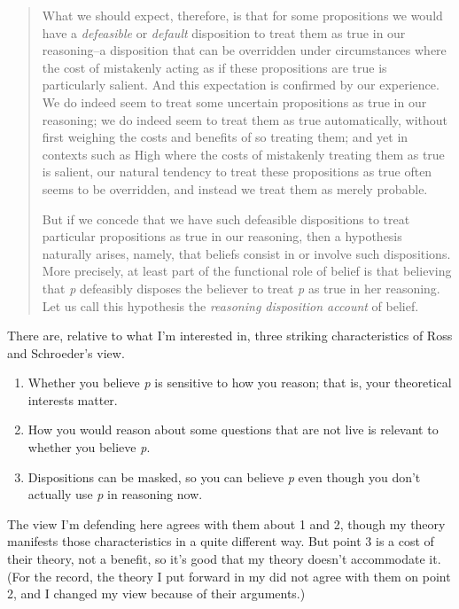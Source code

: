 \documentclass[11pt,]{book}
\providecommand{\tightlist}{%
  \setlength{\itemsep}{0pt}\setlength{\parskip}{0pt}}
\begin{document}
\begin{quote}
What we should expect, therefore, is that for some propositions we would have a \emph{defeasible} or \emph{default} disposition to treat them as true in our reasoning--a disposition that can be overridden under circumstances where the cost of mistakenly acting as if these propositions are true is particularly salient. And this expectation is confirmed by our experience. We do indeed seem to treat some uncertain propositions as true in our reasoning; we do indeed seem to treat them as true automatically, without first weighing the costs and benefits of so treating them; and yet in contexts such as High where the costs of mistakenly treating them as true is salient, our natural tendency to treat these propositions as true often seems to be overridden, and instead we treat them as merely probable.

But if we concede that we have such defeasible dispositions to treat particular propositions as true in our reasoning, then a hypothesis naturally arises, namely, that beliefs consist in or involve such dispositions. More precisely, at least part of the functional role of belief is that believing that \emph{p} defeasibly disposes the believer to treat \emph{p} as true in her reasoning. Let us call this hypothesis the \emph{reasoning disposition account} of belief. \citep[ 9-10]{RossSchroeder2014}
\end{quote}

There are, relative to what I'm interested in, three striking characteristics of Ross and Schroeder's view.

\begin{enumerate}
\def\labelenumi{\arabic{enumi}.}
\tightlist
\item
  Whether you believe \emph{p} is sensitive to how you reason; that is, your theoretical interests matter.
\item
  How you would reason about some questions that are not live is relevant to whether you believe \emph{p}.
\item
  Dispositions can be masked, so you can believe \emph{p} even though you don't actually use \emph{p} in reasoning now.
\end{enumerate}

The view I'm defending here agrees with them about 1 and 2, though my theory manifests those characteristics in a quite different way. But point 3 is a cost of their theory, not a benefit, so it's good that my theory doesn't accommodate it. (For the record, the theory I put forward in my \citeyearpar{Weatherson2005-WEACWD} did not agree with them on point 2, and I changed my view because of their arguments.)
\end{document}
